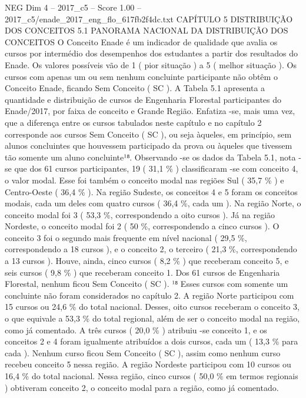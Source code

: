 \begin{textsample}{NEG Dim 4 – 2017\_c5 – Score 1.00 – 2017\_c5/enade\_2017\_eng\_flo\_617fb2f4dc.txt}  \label{ex:f4_neg_130}
CAPÍTULO 5 DISTRIBUIÇÃO DOS CONCEITOS 5.1 PANORAMA NACIONAL DA DISTRIBUIÇÃO DOS CONCEITOS O Conceito Enade é um indicador de qualidade que avalia os cursos por intermédio dos desempenhos dos estudantes a partir dos resultados do Enade.
Os valores possíveis vão de 1 ( pior situação ) a 5 ( melhor situação ).
Os cursos com apenas um ou sem nenhum concluinte participante não obtêm o Conceito Enade, ficando Sem Conceito ( SC ).
A Tabela 5.1 apresenta a quantidade e distribuição de cursos de Engenharia Florestal participantes do Enade/2017, por faixa de conceito e Grande Região.
Enfatiza -se, mais uma vez, que a diferença entre os cursos tabulados neste capítulo e no capítulo 2 corresponde aos cursos Sem Conceito ( SC ), ou seja àqueles, em princípio, sem alunos concluintes que houvessem participado da prova ou àqueles que tivessem tão somente um aluno concluinte¹⁸.
Observando -se os dados da Tabela 5.1, nota -se que dos 61 cursos participantes, 19 ( 31,1 \% ) classificaram -se com conceito 4, o valor modal.
Esse foi também o conceito modal nas regiões Sul ( 35,7 \% ) e Centro-Oeste ( 36,4 \% ).
Na região Sudeste, os conceitos 4 e 5 foram os conceitos modais, cada um deles com quatro cursos ( 36,4 \%, cada um ).
Na região Norte, o conceito modal foi 3 ( 53,3 \%, correspondendo a oito cursos ).
Já na região Nordeste, o conceito modal foi 2 ( 50 \%, correspondendo a cinco cursos ).
O conceito 3 foi o segundo mais frequente em nível nacional ( 29,5 \%, correspondendo a 18 cursos ), e o conceito 2, o terceiro ( 21,3 \%, correspondendo a 13 cursos ).
Houve, ainda, cinco cursos ( 8,2 \% ) que receberam conceito 5, e seis cursos ( 9,8 \% ) que receberam conceito 1.
Dos 61 cursos de Engenharia Florestal, nenhum ficou Sem Conceito ( SC ). ¹⁸ Esses cursos com somente um concluinte não foram considerados no capítulo 2.
A região Norte participou com 15 cursos ou 24,6 \% do total nacional.
Desses, oito cursos receberam o conceito 3, o que equivale a 53,3 \% do total regional, além de ser o conceito modal na região, como já comentado.
A três cursos ( 20,0 \% ) atribuiu -se conceito 1, e os conceitos 2 e 4 foram igualmente atribuídos a dois cursos, cada um ( 13,3 \% para cada ).
Nenhum curso ficou Sem Conceito ( SC ), assim como nenhum curso recebeu conceito 5 nessa região.
A região Nordeste participou com 10 cursos ou 16,4 \% do total nacional.
Nessa região, cinco cursos ( 50,0 \% em termos regionais ) obtiveram conceito 2, o conceito modal para a região, como já comentado.

\end{textsample}
